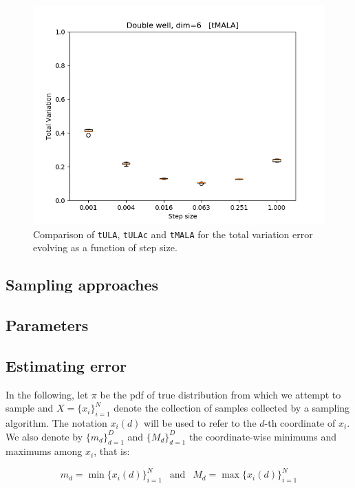 \begin{figure}[H]
\begin{minipage}[b]{0.32\textwidth}
    \includegraphics[width=\textwidth]{Figures/tmala_tv.png}
  \end{minipage}
   \caption{Comparison of \texttt{tULA}, \texttt{tULAc} and \texttt{tMALA} for the total variation error evolving as a function of step size.}
\end{figure}




\subsection{Sampling approaches}

\subsection{Parameters}






\subsection{Estimating error}

In the following, let $\pi$ be the pdf of true distribution from which we attempt to sample and $X = \{x_i\}_{i=1}^N$ denote the collection of samples collected by a sampling algorithm. The notation $x_i(d)$ will be used to refer to the $d$-th coordinate of $x_i$. We also denote by $\{m_d\}_{d=1}^D$ and $\{M_d\}_{d=1}^D$ the coordinate-wise minimums and maximums among $x_i$, that is:

$$ 
    m_d = \min \{x_i(d)\}_{i=1}^N \ \ \text{ and } \ \ M_d = \max \{x_i(d)\}_{i=1}^N
$$

